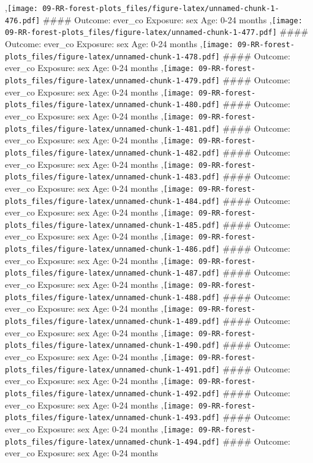\documentclass[
  9pt,
]{book}
\begin{document}
,\texttt{[image: 09-RR-forest-plots\_files/figure-latex/unnamed-chunk-1-476.pdf]}
\#\#\#\# Outcome: ever\_co Exposure: sex Age: 0-24 months
,\texttt{[image: 09-RR-forest-plots\_files/figure-latex/unnamed-chunk-1-477.pdf]}
\#\#\#\# Outcome: ever\_co Exposure: sex Age: 0-24 months
,\texttt{[image: 09-RR-forest-plots\_files/figure-latex/unnamed-chunk-1-478.pdf]}
\#\#\#\# Outcome: ever\_co Exposure: sex Age: 0-24 months
,\texttt{[image: 09-RR-forest-plots\_files/figure-latex/unnamed-chunk-1-479.pdf]}
\#\#\#\# Outcome: ever\_co Exposure: sex Age: 0-24 months
,\texttt{[image: 09-RR-forest-plots\_files/figure-latex/unnamed-chunk-1-480.pdf]}
\#\#\#\# Outcome: ever\_co Exposure: sex Age: 0-24 months
,\texttt{[image: 09-RR-forest-plots\_files/figure-latex/unnamed-chunk-1-481.pdf]}
\#\#\#\# Outcome: ever\_co Exposure: sex Age: 0-24 months
,\texttt{[image: 09-RR-forest-plots\_files/figure-latex/unnamed-chunk-1-482.pdf]}
\#\#\#\# Outcome: ever\_co Exposure: sex Age: 0-24 months
,\texttt{[image: 09-RR-forest-plots\_files/figure-latex/unnamed-chunk-1-483.pdf]}
\#\#\#\# Outcome: ever\_co Exposure: sex Age: 0-24 months
,\texttt{[image: 09-RR-forest-plots\_files/figure-latex/unnamed-chunk-1-484.pdf]}
\#\#\#\# Outcome: ever\_co Exposure: sex Age: 0-24 months
,\texttt{[image: 09-RR-forest-plots\_files/figure-latex/unnamed-chunk-1-485.pdf]}
\#\#\#\# Outcome: ever\_co Exposure: sex Age: 0-24 months
,\texttt{[image: 09-RR-forest-plots\_files/figure-latex/unnamed-chunk-1-486.pdf]}
\#\#\#\# Outcome: ever\_co Exposure: sex Age: 0-24 months
,\texttt{[image: 09-RR-forest-plots\_files/figure-latex/unnamed-chunk-1-487.pdf]}
\#\#\#\# Outcome: ever\_co Exposure: sex Age: 0-24 months
,\texttt{[image: 09-RR-forest-plots\_files/figure-latex/unnamed-chunk-1-488.pdf]}
\#\#\#\# Outcome: ever\_co Exposure: sex Age: 0-24 months
,\texttt{[image: 09-RR-forest-plots\_files/figure-latex/unnamed-chunk-1-489.pdf]}
\#\#\#\# Outcome: ever\_co Exposure: sex Age: 0-24 months
,\texttt{[image: 09-RR-forest-plots\_files/figure-latex/unnamed-chunk-1-490.pdf]}
\#\#\#\# Outcome: ever\_co Exposure: sex Age: 0-24 months
,\texttt{[image: 09-RR-forest-plots\_files/figure-latex/unnamed-chunk-1-491.pdf]}
\#\#\#\# Outcome: ever\_co Exposure: sex Age: 0-24 months
,\texttt{[image: 09-RR-forest-plots\_files/figure-latex/unnamed-chunk-1-492.pdf]}
\#\#\#\# Outcome: ever\_co Exposure: sex Age: 0-24 months
,\texttt{[image: 09-RR-forest-plots\_files/figure-latex/unnamed-chunk-1-493.pdf]}
\#\#\#\# Outcome: ever\_co Exposure: sex Age: 0-24 months
,\texttt{[image: 09-RR-forest-plots\_files/figure-latex/unnamed-chunk-1-494.pdf]}
\#\#\#\# Outcome: ever\_co Exposure: sex Age: 0-24 months
\end{document}
